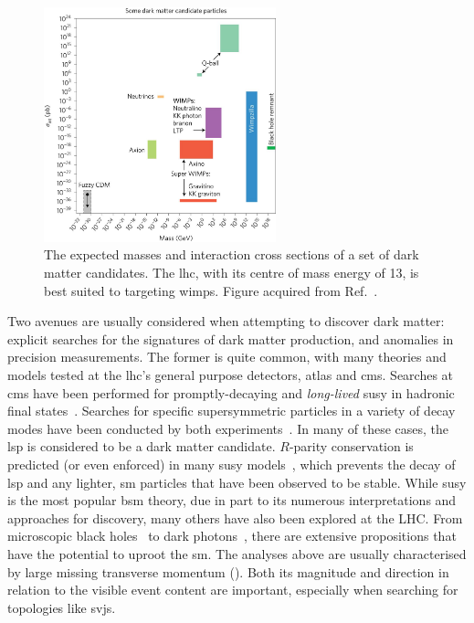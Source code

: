 \begin{figure}[htbp]
    \centering
    \includegraphics[width=0.6\textwidth]{figures/dm_masses_xsecs.jpg}
    \caption[The expected masses and interaction cross sections of a set of dark matter candidates]{The expected masses and interaction cross sections of a set of dark matter candidates. The \acrshort{lhc}, with its centre of mass energy of 13\TeV, is best suited to targeting \glspl{wimp}. Figure acquired from Ref.~.}
    \label{fig:dm_masses_xsecs}
\end{figure}

Two avenues are usually considered when attempting to discover dark matter: explicit searches for the signatures of dark matter production, and anomalies in precision measurements. The former is quite common, with many theories and models tested at the \acrshort{lhc}'s general purpose detectors, \acrshort{atlas} and \acrshort{cms}. Searches at \acrshort{cms} have been performed for promptly-decaying and \emph{long-lived} \acrlong{susy} in hadronic final states~\cite{CMS-PAPER-SUS-15-005-published,SUS16038published}. Searches for specific supersymmetric particles in a variety of decay modes have been conducted by both experiments~\cite{CANEPA2019100033}. In many of these cases, the \acrfull{lsp} is considered to be a dark matter candidate. $R$-parity conservation is predicted (or even enforced) in many \acrshort{susy} models~\cite{Martin:1997ns}, which prevents the decay of \acrshort{lsp} and any lighter, \acrlong{sm} particles that have been observed to be stable. While \acrlong{susy} is the most popular \acrshort{bsm} theory, due in part to its numerous interpretations and approaches for discovery, many others have also been explored at the LHC. From microscopic black holes~\cite{Khachatryan:2010wx} to dark photons~\cite{dark_photons_CMS_2019}, there are extensive propositions that have the potential to uproot the \acrlong{sm}. The analyses above are usually characterised by large missing transverse momentum (\ptvecmiss). Both its magnitude and direction in relation to the visible event content are important, especially when searching for topologies like \glspl{svj}. 


